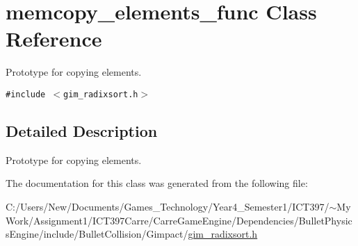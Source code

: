 \hypertarget{classmemcopy__elements__func}{
\section{memcopy\_\-elements\_\-func Class Reference}
\label{classmemcopy__elements__func}
}
Prototype for copying elements.  


{\tt \#include $<$gim\_\-radixsort.h$>$}



\subsection{Detailed Description}
Prototype for copying elements. 

The documentation for this class was generated from the following file:\begin{CompactItemize}
\item 
C:/Users/New/Documents/Games\_\-Technology/Year4\_\-Semester1/ICT397/$\sim$My Work/Assignment1/ICT397Carre/CarreGameEngine/Dependencies/BulletPhysicsEngine/include/BulletCollision/Gimpact/\hyperlink{gim__radixsort_8h}{gim\_\-radixsort.h}\end{CompactItemize}
